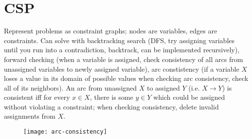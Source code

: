 \section{CSP}
Represent problems as constraint graphs; nodes are variables, edges are constraints. Can solve with backtracking search (DFS, try assigning variables until you run into a contradiction, backtrack, can be implemented recursively), forward checking (when a variable is assigned, check consistency of all arcs from unassigned variables to newly assigned variable), arc constistency (if a variable $X$ loses a value in its domain of possible values when checking arc consistency, check all of its neighbors). An arc from unassigned $X$ to assigned $Y$ (i.e. $X\rightarrow Y$) is consistent iff for every $x\in X$, there is some $y\in Y$ which could be assigned without violating a constraint; when checking consistency, delete invalid assignments from $X$.
\begin{figure}[H]
\centering
\texttt{[image: arc-consistency]}
\end{figure}